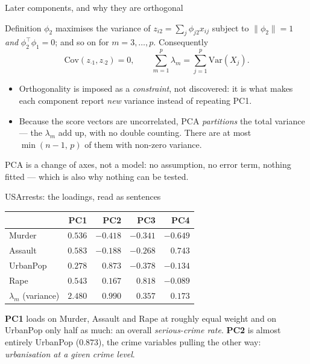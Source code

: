 \documentclass[aspectratio=169,11pt]{beamer}
\begin{document}
\begin{frame}{Later components, and why they are orthogonal}
  \footnotesize
  \begin{block}{Definition}
    $\phi_2$ maximises the variance of $z_{i2}=\sum_j\phi_{j2}x_{ij}$ subject to
    $\|\phi_2\|=1$ \emph{and} $\phi_2^\top\phi_1=0$; and so on for $m=3,\dots,p$.
    Consequently
    \[
      \mathrm{Cov}(z_{\cdot 1}, z_{\cdot 2}) = 0,
      \qquad \sum_{m=1}^{p}\lambda_m = \sum_{j=1}^{p}\mathrm{Var}(X_j) .
    \]
  \end{block}
  \begin{readme}
    \begin{itemize}
      \item Orthogonality is imposed as a \emph{constraint}, not discovered: it is what
            makes each component report \emph{new} variance instead of repeating PC1.
      \item Because the score vectors are uncorrelated, PCA \emph{partitions} the total
            variance --- the $\lambda_m$ add up, with no double counting. There are at most
            $\min(n-1,\,p)$ of them with non-zero variance.
    \end{itemize}
  \end{readme}
  \begin{takeaway}
    PCA is a change of axes, not a model: no assumption, no error term, nothing fitted ---
    which is also why nothing can be tested.
  \end{takeaway}
\end{frame}

\begin{frame}{USArrests: the loadings, read as sentences}
  \footnotesize
  \begin{center}
  \begin{tabular}{@{}lrrrr@{}}
    \toprule
    & \textbf{PC1} & \textbf{PC2} & \textbf{PC3} & \textbf{PC4} \\
    \midrule
    Murder    & $0.536$ & $-0.418$ & $-0.341$ & $-0.649$ \\
    Assault   & $0.583$ & $-0.188$ & $-0.268$ & $\ \ 0.743$ \\
    UrbanPop  & $0.278$ & $\ \ 0.873$ & $-0.378$ & $-0.134$ \\
    Rape      & $0.543$ & $\ \ 0.167$ & $\ \ 0.818$ & $-0.089$ \\
    \midrule
    $\lambda_m$ (variance) & $2.480$ & $0.990$ & $0.357$ & $0.173$ \\
    \bottomrule
  \end{tabular}
  \end{center}
  \begin{readme}
    \textbf{PC1} loads on Murder, Assault and Rape at roughly equal weight and on UrbanPop
    only half as much: an overall \emph{serious-crime rate}. \textbf{PC2} is almost entirely
    UrbanPop ($0.873$), the crime variables pulling the other way: \emph{urbanisation at a
    given crime level}.
  \end{readme}
\end{frame}
\end{document}
